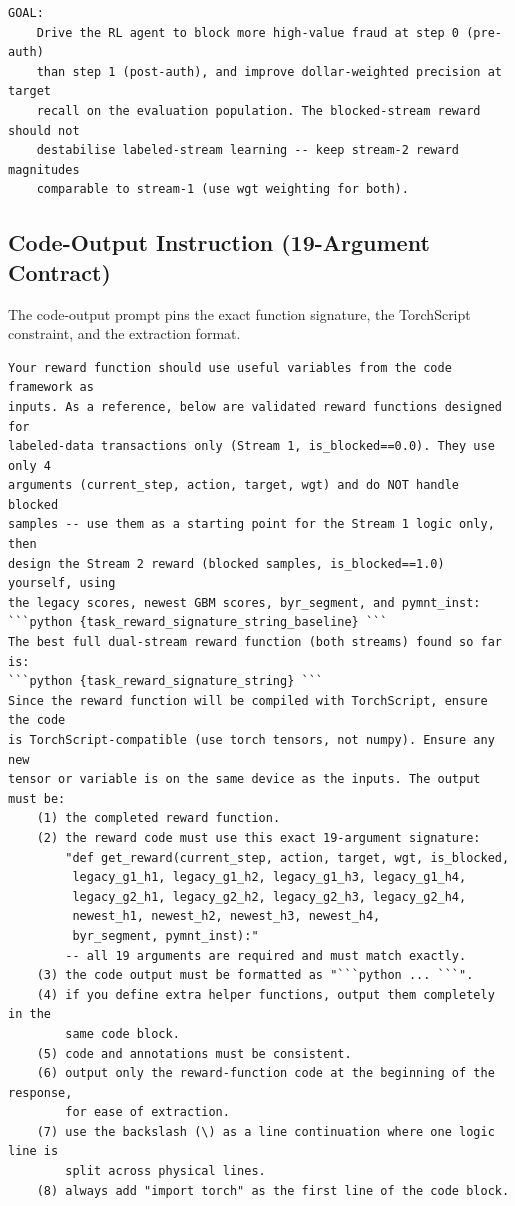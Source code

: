 \documentclass[11pt]{article}
\begin{document}
\begin{lstlisting}[basicstyle=\ttfamily\scriptsize,breaklines=true,numbers=none,frame=single,captionpos=b,caption={Dual-stream task description prompt (anonymized, ASCII).},label={lst:prompt_task}]
GOAL:
    Drive the RL agent to block more high-value fraud at step 0 (pre-auth)
    than step 1 (post-auth), and improve dollar-weighted precision at target
    recall on the evaluation population. The blocked-stream reward should not
    destabilise labeled-stream learning -- keep stream-2 reward magnitudes
    comparable to stream-1 (use wgt weighting for both).
\end{lstlisting}

\subsection{Code-Output Instruction (19-Argument Contract)}
\label{appendix:prompt-codetip}
The code-output prompt pins the exact function signature, the TorchScript
constraint, and the extraction format.

\begin{lstlisting}[basicstyle=\ttfamily\scriptsize,breaklines=true,numbers=none,frame=single,captionpos=b,caption={Code-output instruction prompt (anonymized, ASCII). The two backtick-fenced placeholders are filled at runtime.},label={lst:prompt_codetip}]
Your reward function should use useful variables from the code framework as
inputs. As a reference, below are validated reward functions designed for
labeled-data transactions only (Stream 1, is_blocked==0.0). They use only 4
arguments (current_step, action, target, wgt) and do NOT handle blocked
samples -- use them as a starting point for the Stream 1 logic only, then
design the Stream 2 reward (blocked samples, is_blocked==1.0) yourself, using
the legacy scores, newest GBM scores, byr_segment, and pymnt_inst:
```python {task_reward_signature_string_baseline} ```
The best full dual-stream reward function (both streams) found so far is:
```python {task_reward_signature_string} ```
Since the reward function will be compiled with TorchScript, ensure the code
is TorchScript-compatible (use torch tensors, not numpy). Ensure any new
tensor or variable is on the same device as the inputs. The output must be:
    (1) the completed reward function.
    (2) the reward code must use this exact 19-argument signature:
        "def get_reward(current_step, action, target, wgt, is_blocked,
         legacy_g1_h1, legacy_g1_h2, legacy_g1_h3, legacy_g1_h4,
         legacy_g2_h1, legacy_g2_h2, legacy_g2_h3, legacy_g2_h4,
         newest_h1, newest_h2, newest_h3, newest_h4,
         byr_segment, pymnt_inst):"
        -- all 19 arguments are required and must match exactly.
    (3) the code output must be formatted as "```python ... ```".
    (4) if you define extra helper functions, output them completely in the
        same code block.
    (5) code and annotations must be consistent.
    (6) output only the reward-function code at the beginning of the response,
        for ease of extraction.
    (7) use the backslash (\) as a line continuation where one logic line is
        split across physical lines.
    (8) always add "import torch" as the first line of the code block.
\end{lstlisting}
\end{document}
